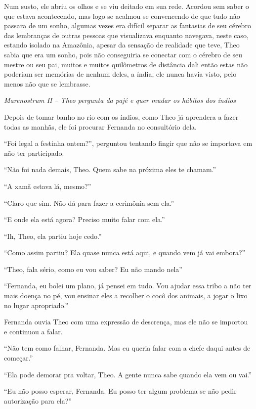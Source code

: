Num susto, ele abriu os olhos e se viu
deitado em sua rede. Acordou sem saber o que estava acontecendo, mas
logo se acalmou se convencendo de que tudo não passara de um sonho,
algumas vezes era difícil separar as fantasias de seu cérebro das
lembranças de outras pessoas que visualizava enquanto navegava, neste
caso, estando isolado na Amazônia, apesar da sensação de realidade que
teve, Theo sabia que era um sonho, pois não conseguiria se conectar com
o cérebro de seu mestre ou seu pai, muitos e muitos quilômetros de
distância dali então estas não poderiam ser memórias de nenhum deles, a
índia, ele nunca havia visto, pelo menos não que se lembrasse.

\asterisc

\emph{Marenostrum II -- Theo pergunta da pajé e quer mudar os hábitos dos índios}

Depois de tomar banho no rio com os índios, como Theo já aprendera a
fazer todas as manhãs, ele foi procurar Fernanda no consultório dela.

``Foi legal a festinha ontem?'', perguntou tentando fingir que não se
importava em não ter participado.

``Não foi nada demais, Theo. Quem sabe na próxima eles te chamam.''

``A xamã estava lá, mesmo?''

``Claro que sim. Não dá para fazer a cerimônia sem ela.''

``E onde ela está agora? Preciso muito falar com ela.''

``Ih, Theo, ela partiu hoje cedo.''

``Como assim partiu? Ela quase nunca está aqui, e quando vem já vai
embora?''

``Theo, fala sério, como eu vou saber? Eu não mando nela''

``Fernanda, eu bolei um plano, já pensei em tudo. Vou ajudar essa tribo
a não ter mais doença no pé, vou ensinar eles a recolher o cocô dos
animais, a jogar o lixo no lugar apropriado.''

Fernanda ouvia Theo com uma expressão de descrença, mas ele não se
importou e continuou a falar.

``Não tem como falhar, Fernanda. Mas eu queria falar com a chefe daqui
antes de começar.''

``Ela pode demorar pra voltar, Theo. A gente nunca sabe quando ela vem
ou vai.''

``Eu não posso esperar, Fernanda. Eu posso ter algum problema se não
pedir autorização para ela?''

